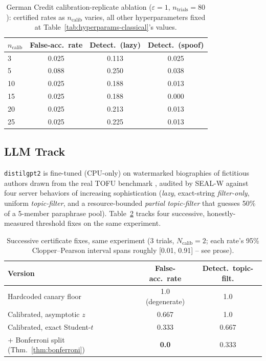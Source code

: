 \documentclass[10pt,journal,compsoc]{IEEEtran}
\begin{document}
\begin{table}[t]
\centering
\footnotesize
\caption{German Credit calibration-replicate ablation ($\varepsilon{=}1$, $n_{\text{trials}}{=}80$): certified rates as $n_{\text{calib}}$ varies, all other hyperparameters fixed at Table~\ref{tab:hyperparams-classical}'s values.}
\label{tab:calibablation}
\begin{tabular}{@{}lccc@{}}
\toprule
$n_{\text{calib}}$ & False-acc.\ rate & Detect.\ (lazy) & Detect.\ (spoof) \\
\midrule
3  & 0.025 & 0.113 & 0.025 \\
5  & 0.088 & 0.250 & 0.038 \\
10 & 0.025 & 0.188 & 0.013 \\
15 & 0.025 & 0.188 & 0.000 \\
20 & 0.025 & 0.213 & 0.013 \\
25 & 0.025 & 0.225 & 0.013 \\
\bottomrule
\end{tabular}
\end{table}

\subsection{LLM Track}

\texttt{distilgpt2} is fine-tuned (CPU-only) on watermarked biographies of fictitious authors drawn from the real TOFU benchmark \cite{maini2024tofu}, audited by SEAL-W against four server behaviors of increasing sophistication (\emph{lazy}, exact-string \emph{filter-only}, uniform \emph{topic-filter}, and a resource-bounded \emph{partial topic-filter} that guesses 50\% of a 5-member paraphrase pool). Table~\ref{tab:llmprogression} tracks four successive, honestly-measured threshold fixes on the same experiment.

\begin{table}[t]
\centering
\footnotesize
\caption{Successive certificate fixes, same experiment (3 trials, $N_{\text{calib}}{=}2$; each rate's 95\% Clopper--Pearson interval spans roughly [0.01, 0.91] -- see prose).}
\label{tab:llmprogression}
\begin{tabular}{@{}lcc@{}}
\toprule
Version & False-acc.\ rate & Detect.\ topic-filt. \\
\midrule
Hardcoded canary floor & 1.0 (degenerate) & 1.0 \\
Calibrated, asymptotic $z$ & 0.667 & 1.0 \\
Calibrated, exact Student-$t$ & 0.333 & 0.667 \\
+ Bonferroni split (Thm.~\ref{thm:bonferroni}) & \textbf{0.0} & 0.333 \\
\bottomrule
\end{tabular}
\end{table}
\end{document}
